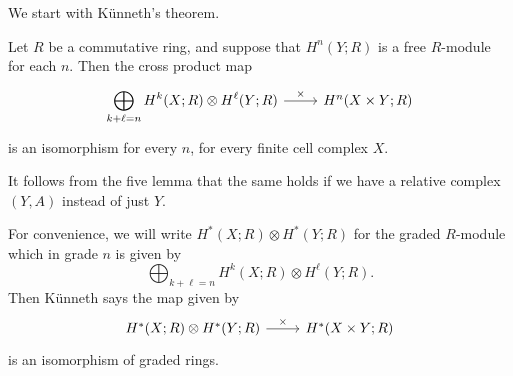 \documentclass[a4paper]{article}
\theoremstyle{definition}
\begin{document}
We start with K\"unneth's theorem.
\begin{thm}
  Let $R$ be a commutative ring, and suppose that $H^n(Y; R)$ is a free $R$-module for each $n$. Then the cross product map
  \[
    \begin{tikzcd}
      \displaystyle\bigoplus_{k + \ell = n}H^k(X; R) \otimes H^\ell(Y; R) \ar[r, "\times"] & H^n(X \times Y; R)
    \end{tikzcd}
  \]
  is an isomorphism for every $n$, for every finite cell complex $X$.

  It follows from the five lemma that the same holds if we have a relative complex $(Y, A)$ instead of just $Y$.
\end{thm}
For convenience, we will write $H^*(X; R) \otimes H^*(Y; R)$ for the graded $R$-module which in grade $n$ is given by
\[
  \bigoplus_{k + \ell = n} H^k(X; R) \otimes H^\ell (Y; R).
\]
Then K\"unneth says the map given by
\[
  \begin{tikzcd}
    H^*(X; R) \otimes H^*(Y; R) \ar[r, "\times"] & H^*(X \times Y; R)
  \end{tikzcd}
\]
is an isomorphism of graded rings.
\end{document}
